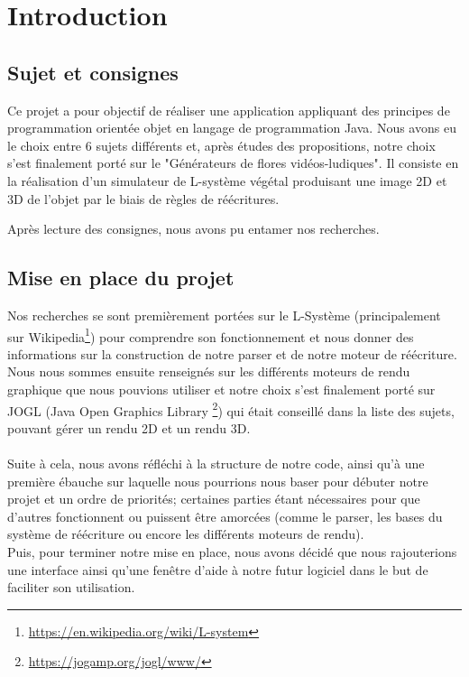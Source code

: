 \chapter{Introduction}

\section{Sujet et consignes}
Ce projet a pour objectif de réaliser une application appliquant des principes de programmation orientée objet en langage de programmation Java. Nous avons eu le choix entre 6 sujets différents et, après études des propositions, notre choix s’est finalement porté sur le "Générateurs de flores vidéos-ludiques". Il consiste en la réalisation d’un simulateur de L-système végétal produisant une image 2D et 3D de l’objet par le biais de règles de réécritures.


Après lecture des consignes, nous avons pu entamer nos recherches.

\section{Mise en place du projet}
\label{sec:MEPprog}
Nos recherches se sont premièrement portées sur le L-Système (principalement sur Wikipedia\footnote{\href{https://en.wikipedia.org/wiki/L-system}{https://en.wikipedia.org/wiki/L-system}}) pour comprendre son fonctionnement et nous donner des informations sur la construction de notre parser et de notre moteur de réécriture. Nous nous sommes ensuite renseignés sur les différents moteurs de rendu graphique que nous pouvions utiliser et notre choix s'est finalement porté sur JOGL (Java Open Graphics Library \footnote{\href{https://jogamp.org/jogl/www/}{https://jogamp.org/jogl/www/}}) qui était conseillé dans la liste des sujets, pouvant gérer un rendu 2D et un rendu 3D.
\\
\\
Suite à cela, nous avons réfléchi à la structure de notre code, ainsi qu'à une première ébauche sur laquelle nous pourrions nous baser pour débuter notre projet et un ordre de priorités; certaines parties étant nécessaires pour que d'autres fonctionnent ou puissent être amorcées (comme le parser, les bases du système de réécriture ou encore les différents moteurs de rendu).
\\
Puis, pour terminer notre mise en place, nous avons décidé que nous rajouterions une interface ainsi qu'une fenêtre d'aide à notre futur logiciel dans le but de faciliter son utilisation.


